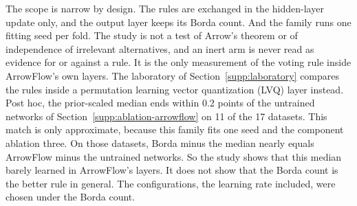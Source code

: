 The scope is narrow by design. The rules are exchanged in the hidden-layer update only, and the output layer keeps its Borda count. And the family runs one fitting seed per fold. The study is not a test of Arrow's theorem or of independence of irrelevant alternatives, and an inert arm is never read as evidence for or against a rule. It is the only measurement of the voting rule inside ArrowFlow's own layers. The laboratory of Section~\ref{supp:laboratory} compares the rules inside a permutation learning vector quantization (LVQ) layer instead. Post hoc, the prior-scaled median ends within 0.2 points of the untrained networks of Section~\ref{supp:ablation-arrowflow} on 11 of the 17 datasets. This match is only approximate, because this family fits one seed and the component ablation three. On those datasets, Borda minus the median nearly equals ArrowFlow minus the untrained networks. So the study shows that this median barely learned in ArrowFlow's layers. It does not show that the Borda count is the better rule in general. The configurations, the learning rate included, were chosen under the Borda count.

\clearpage



